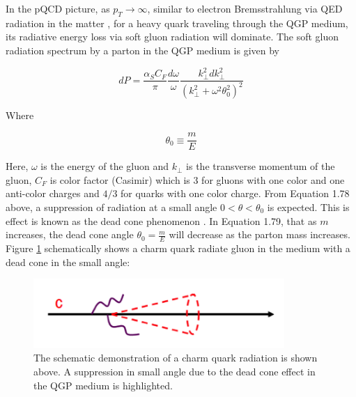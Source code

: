 
In the pQCD picture, as $p_T \rightarrow \infty$, similar to electron Bremsstrahlung via QED radiation in the matter \cite{Brems}, for a heavy quark traveling through the QGP medium, its radiative energy loss via soft gluon radiation will dominate. The soft gluon radiation spectrum by a parton in the QGP medium is given by \cite{DEADCONE}

\begin{equation}
dP = \frac{\alpha_S C_{F}}{\pi} \frac{d\omega}{\omega}\frac{k_{\perp}^2 dk_{\perp}^2}{(k_{\perp}^2  + \omega^2\theta_0^2)^2}
\end{equation}

Where 

\begin{equation}
\theta_0 \equiv \frac{m}{E}
\end{equation}

Here, $\omega$ is the energy of the gluon and $k_{\perp}$ is the transverse momentum of the gluon, $C_F$ is color factor (Casimir) which is $3$ for gluons with one color and one anti-color charges and $4/3$ for quarks with one color charge. From Equation 1.78 above, a suppression of radiation at a small angle $0 < \theta < \theta_0$ is expected. This is effect is known as the dead cone phenomenon \cite{DEADCONE}. In Equation 1.79, that as $m$ increases, the dead cone angle $\theta_0 = \frac{m}{E}$ will decrease as the parton mass increases. Figure \ref{DeadConePic} schematically shows a charm quark radiate gluon in the medium with a dead cone in the small angle:

 \begin{figure}[hbtp]
\begin{center}
\includegraphics[width=0.85\textwidth]{Figures/Chapter1/CharmDeadCone.png}
\caption{The schematic demonstration of a charm quark radiation is shown above. A suppression in small angle due to the dead cone effect in the QGP medium is highlighted.}
\label{DeadConePic}
\end{center}
\end{figure}  


